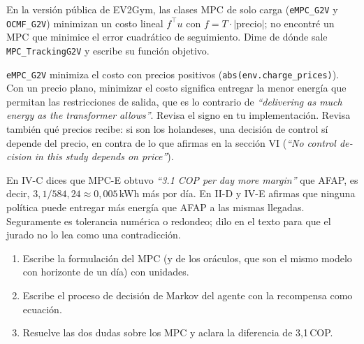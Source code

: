 \documentclass[11pt]{article}
\begin{document}
\begin{duda}
En la versión pública de EV2Gym, las clases MPC de solo carga (\texttt{eMPC\_G2V} y \texttt{OCMF\_G2V}) minimizan un costo lineal $f^\top u$ con $f = T \cdot |\text{precio}|$; no encontré un MPC que minimice el error cuadrático de seguimiento. Dime de dónde sale \texttt{MPC\_TrackingG2V} y escribe su función objetivo.
\end{duda}

\begin{duda}
\texttt{eMPC\_G2V} minimiza el costo con precios positivos (\texttt{abs(env.charge\_prices)}). Con un precio plano, minimizar el costo significa entregar la menor energía que permitan las restricciones de salida, que es lo contrario de \foreignlanguage{english}{\emph{``delivering as much energy as the transformer allows''}}. Revisa el signo en tu implementación. Revisa también qué precios recibe: si son los holandeses, una decisión de control sí depende del precio, en contra de lo que afirmas en la sección VI (\foreignlanguage{english}{\emph{``No control decision in this study depends on price''}}).
\end{duda}

\begin{error}
En IV-C dices que MPC-E obtuvo \foreignlanguage{english}{\emph{``3.1 COP per day more margin''}} que AFAP, es decir, $3{,}1/584{,}24 \approx 0{,}005$\,kWh más por día. En II-D y IV-E afirmas que ninguna política puede entregar más energía que AFAP a las mismas llegadas. Seguramente es tolerancia numérica o redondeo; dilo en el texto para que el jurado no lo lea como una contradicción.
\end{error}

\begin{tarea}
\begin{enumerate}
\item Escribe la formulación del MPC (y de los oráculos, que son el mismo modelo con horizonte de un día) con unidades.
\item Escribe el proceso de decisión de Markov del agente con la recompensa como ecuación.
\item Resuelve las dos dudas sobre los MPC y aclara la diferencia de 3,1\,COP.
\end{enumerate}
\end{tarea}

\end{document}
